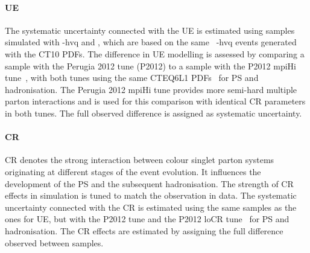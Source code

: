 \paragraph{\gls{UE}}\mbox{}
%
The systematic uncertainty connected with the \gls{UE} is estimated using samples simulated with \Powheg-hvq and \Pythia, which are based on the same \genlevel\ \Powheg-hvq events generated with the CT10 \glspl{PDF}. 
%
The difference in \gls{UE} modelling is assessed by comparing a sample with the Perugia 2012 tune (P2012) to a sample with the P2012 mpiHi tune~\cite{Skands}, with both tunes using the same CTEQ6L1 \glspl{PDF}~\cite{cteq5l} for \gls{PS} and hadronisation. The Perugia 2012 mpiHi tune provides more semi-hard multiple parton interactions and is used for this comparison with identical \gls{CR} parameters in both tunes. The full observed difference is assigned as systematic uncertainty. 
%
%
%
%
\paragraph{\gls{CR}}\mbox{}
\gls{CR} denotes the strong interaction between colour singlet parton systems originating at different stages of the event evolution. It influences the development of the \gls{PS} and the subsequent hadronisation. The strength of \gls{CR} effects in simulation is tuned to match the observation in data.
%
The systematic uncertainty connected with the \gls{CR} is estimated using the same samples as the ones for \gls{UE}, but with the P2012 tune and the P2012 loCR tune~\cite{Skands} for \gls{PS} and hadronisation. 
%
The \gls{CR} effects are estimated by assigning the full difference observed between samples. 
%
%
%

